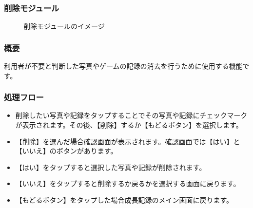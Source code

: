 \documentclass[a4j]{jarticle}
\begin{document}
\subsubsection{削除モジュール\label{delete}}
\begin{figure}[H]
    \begin{center}
    \caption {削除モジュールのイメージ}
    \label{functionselection}
    \end{center}
\end{figure}

\subsubsection*{概要}
利用者が不要と判断した写真やゲームの記録の消去を行うために使用する機能です。

\subsubsection*{処理フロー}
\begin{itemize}
\item 削除したい写真や記録をタップすることでその写真や記録にチェックマークが表示されます。その後、【削除】するか【もどるボタン】を選択します。
\item 【削除】を選んだ場合確認画面が表示されます。確認画面では【はい】と【いいえ】のボタンがあります。
\item 【はい】をタップすると選択した写真や記録が削除されます。
\item 【いいえ】をタップすると削除するか戻るかを選択する画面に戻ります。
\item 【もどるボタン】をタップした場合成長記録のメイン画面に戻ります。
\end{itemize}
\end{document}
